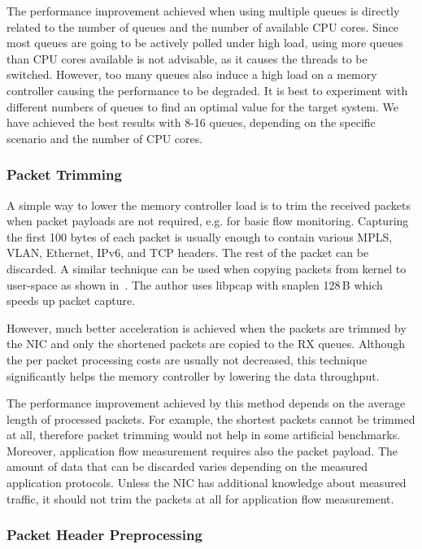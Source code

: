 The performance improvement achieved when using multiple queues is directly related to the number of queues and the number of available CPU cores. Since most queues are going to be actively polled under high load, using more queues than CPU cores available is not advisable, as it causes the threads to be switched. However, too many queues also induce a high load on a memory controller causing the performance to be degraded. It is best to experiment with different numbers of queues to find an optimal value for the target system. We have achieved the best results with 8-16 queues, depending on the specific scenario and the number of CPU cores.

\subsubsection{Packet Trimming}

A simple way to lower the memory controller load is to trim the received packets when packet payloads are not required, e.g. for basic flow monitoring. Capturing the first 100 bytes of each packet is usually enough to contain various MPLS, VLAN, Ethernet, IPv6, and TCP headers. The rest of the packet can be discarded. A similar technique can be used when copying packets from kernel to user-space as shown in~\cite{Deri-2004-Improving}. The author uses libpcap with snaplen 128\,B which speeds up packet capture.

However, much better acceleration is achieved when the packets are trimmed by the NIC and only the shortened packets are copied to the RX queues. Although the per packet processing costs are usually not decreased, this technique significantly helps the memory controller by lowering the data throughput. 

The performance improvement achieved by this method depends on the average length of processed packets. For example, the shortest packets cannot be trimmed at all, therefore packet trimming would not help in some artificial benchmarks. Moreover, application flow measurement requires also the packet payload. The amount of data that can be discarded varies depending on the measured application protocols. Unless the NIC has additional knowledge about measured traffic, it should not trim the packets at all for application flow measurement.

\subsubsection{Packet Header Preprocessing}

